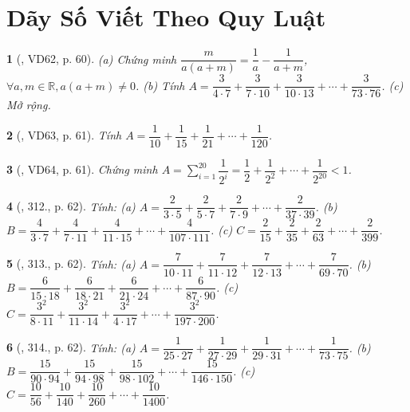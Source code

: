 \documentclass{article}
\newtheorem{baitoan}{}
\begin{document}

\section{Dãy Số Viết Theo Quy Luật}

\begin{baitoan}[\cite{Tuyen_Toan_6}, VD62, p. 60]
	(a) Chứng minh $\dfrac{m}{a(a + m)} = \dfrac{1}{a} - \dfrac{1}{a + m}$, $\forall a,m\in\mathbb{R},a(a + m)\ne0$. (b) Tính $A = \dfrac{3}{4\cdot7} + \dfrac{3}{7\cdot10} + \dfrac{3}{10\cdot13} + \cdots + \dfrac{3}{73\cdot76}$. (c) Mở rộng.
\end{baitoan}

\begin{baitoan}[\cite{Tuyen_Toan_6}, VD63, p. 61]
	Tính $A = \dfrac{1}{10} + \dfrac{1}{15} + \dfrac{1}{21} + \cdots + \dfrac{1}{120}$.
\end{baitoan}

\begin{baitoan}[\cite{Tuyen_Toan_6}, VD64, p. 61]
	Chứng minh $A = \sum_{i=1}^{20} \dfrac{1}{2^i} = \dfrac{1}{2} + \dfrac{1}{2^2} + \cdots + \dfrac{1}{2^{20}} < 1$.
\end{baitoan}

\begin{baitoan}[\cite{Tuyen_Toan_6}, 312., p. 62]
	Tính: (a) $A = \dfrac{2}{3\cdot5} + \dfrac{2}{5\cdot7} + \dfrac{2}{7\cdot9} + \cdots + \dfrac{2}{37\cdot39}$. (b) $B = \dfrac{4}{3\cdot7} + \dfrac{4}{7\cdot11} + \dfrac{4}{11\cdot15} + \cdots + \dfrac{4}{107\cdot111}$. (c) $C = \dfrac{2}{15} + \dfrac{2}{35} + \dfrac{2}{63} + \cdots + \dfrac{2}{399}$.
\end{baitoan}

\begin{baitoan}[\cite{Tuyen_Toan_6}, 313., p. 62]
	Tính: (a) $A = \dfrac{7}{10\cdot11} + \dfrac{7}{11\cdot12} + \dfrac{7}{12\cdot13} + \cdots + \dfrac{7}{69\cdot70}$. (b) $B = \dfrac{6}{15\cdot18} + \dfrac{6}{18\cdot21} + \dfrac{6}{21\cdot24} + \cdots + \dfrac{6}{87\cdot90}$. (c) $C = \dfrac{3^2}{8\cdot11} + \dfrac{3^2}{11\cdot14} + \dfrac{3^2}{4\cdot17} + \cdots + \dfrac{3^2}{197\cdot200}$.
\end{baitoan}

\begin{baitoan}[\cite{Tuyen_Toan_6}, 314., p. 62]
	Tính: (a) $A = \dfrac{1}{25\cdot27} + \dfrac{1}{27\cdot29} + \dfrac{1}{29\cdot31} + \cdots + \dfrac{1}{73\cdot75}$. (b) $B = \dfrac{15}{90\cdot94} + \dfrac{15}{94\cdot98} + \dfrac{15}{98\cdot102} + \cdots + \dfrac{15}{146\cdot150}$. (c) $C = \dfrac{10}{56} + \dfrac{10}{140} + \dfrac{10}{260} + \cdots + \dfrac{10}{1400}$.
\end{baitoan}
\end{document}
